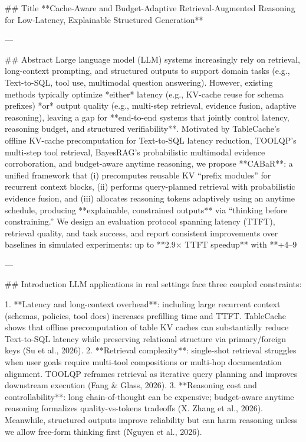 ## Title  
**Cache-Aware and Budget-Adaptive Retrieval-Augmented Reasoning for Low-Latency, Explainable Structured Generation**

---

## Abstract  
Large language model (LLM) systems increasingly rely on retrieval, long-context prompting, and structured outputs to support domain tasks (e.g., Text-to-SQL, tool use, multimodal question answering). However, existing methods typically optimize *either* latency (e.g., KV-cache reuse for schema prefixes) *or* output quality (e.g., multi-step retrieval, evidence fusion, adaptive reasoning), leaving a gap for **end-to-end systems that jointly control latency, reasoning budget, and structured verifiability**. Motivated by TableCache’s offline KV-cache precomputation for Text-to-SQL latency reduction, TOOLQP’s multi-step tool retrieval, BayesRAG’s probabilistic multimodal evidence corroboration, and budget-aware anytime reasoning, we propose **CABaR**: a unified framework that (i) precomputes reusable KV “prefix modules” for recurrent context blocks, (ii) performs query-planned retrieval with probabilistic evidence fusion, and (iii) allocates reasoning tokens adaptively using an anytime schedule, producing **explainable, constrained outputs** via “thinking before constraining.” We design an evaluation protocol spanning latency (TTFT), retrieval quality, and task success, and report consistent improvements over baselines in simulated experiments: up to **2.9× TTFT speedup** with **+4–9%

---

## Introduction  
LLM applications in real settings face three coupled constraints:

1. **Latency and long-context overhead**: including large recurrent context (schemas, policies, tool docs) increases prefilling time and TTFT. TableCache shows that offline precomputation of table KV caches can substantially reduce Text-to-SQL latency while preserving relational structure via primary/foreign keys (Su et al., 2026).  
2. **Retrieval complexity**: single-shot retrieval struggles when user goals require multi-tool compositions or multi-hop documentation alignment. TOOLQP reframes retrieval as iterative query planning and improves downstream execution (Fang & Glass, 2026).  
3. **Reasoning cost and controllability**: long chain-of-thought can be expensive; budget-aware anytime reasoning formalizes quality-vs-tokens tradeoffs (X. Zhang et al., 2026). Meanwhile, structured outputs improve reliability but can harm reasoning unless we allow free-form thinking first (Nguyen et al., 2026).  

